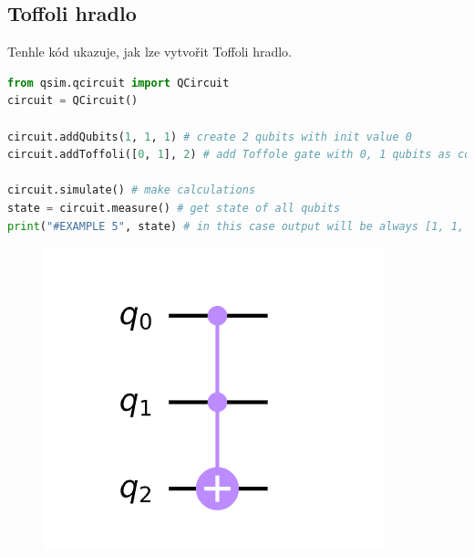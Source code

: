 \documentclass[11pt]{article}
\begin{document}
\subsection{Toffoli hradlo}
Tenhle kód ukazuje, jak lze vytvořit Toffoli hradlo.
\begin{lstlisting}[language=Python, caption=Toffoli gate]
from qsim.qcircuit import QCircuit
circuit = QCircuit()

circuit.addQubits(1, 1, 1) # create 2 qubits with init value 0
circuit.addToffoli([0, 1], 2) # add Toffole gate with 0, 1 qubits as control and 2 qubit as target

circuit.simulate() # make calculations
state = circuit.measure() # get state of all qubits
print("#EXAMPLE 5", state) # in this case output will be always [1, 1, 0]
\end{lstlisting}
\begin{figure}[H]
    \includegraphics[scale=.7]{toffoli_scheme}
    \centering
\end{figure}
\end{document}
